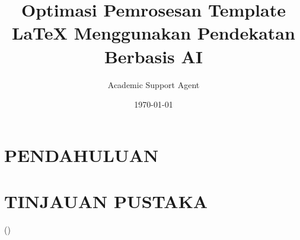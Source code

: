 \documentclass{article}
\title{Optimasi Pemrosesan Template LaTeX Menggunakan Pendekatan Berbasis AI}
\author{Academic Support Agent}
\date{\today}
\begin{document}
\maketitle

\begin{abstract}

\end{abstract}

\chapter{PENDAHULUAN}


\chapter{TINJAUAN PUSTAKA}


\usepackage[portuguese]{babel}
\addto{\captionsportuguese}{%
  \renewcommand{\refname}{\hfill \large REFERÊNCIAS \hfill} %
}
\addto{\captionsportuguese}{%
  \renewcommand{\contentsname}{\hfill SUMÁRIO \hfill}} %
    
\usepackage[T1]{fontenc}
\usepackage{fontspec}
\usepackage{amsmath,esint}
\usepackage{amsfonts}
\usepackage{amssymb}
\usepackage{makeidx}
\usepackage{graphicx}
\usepackage{lettrine}
\usepackage{lmodern}
\usepackage{dirtytalk}
\usepackage{setspace}
    \linespread{1.5}
\usepackage{indentfirst}
    \setlength{\parindent}{1cm}
    \setlength{\parskip}{0pt}
\usepackage{pdfpages}
\usepackage[left=3cm,right=2cm,top=3cm,bottom=2cm]{geometry}
\usepackage{hyperref}
\usepackage{multirow}
\usepackage{booktabs}
\usepackage{subfigure}
\usepackage{fancyhdr}
\usepackage{soul} %

\usepackage[ %
	alf,
	abnt-repeated-title-omit=yes,	
	abnt-emphasize=bf,
	abnt-etal-list=0
	]
	{abntex2cite}
\citebrackets()%

\setmainfont{Times New Roman}
\pagestyle{fancy}
\fancyhead{}
\fancyfoot{}
\fancyhead[R]{\thepage}
\renewcommand{\headrulewidth}{0pt}%
\setlength{\headheight}{14.49998pt}
\end{document}
